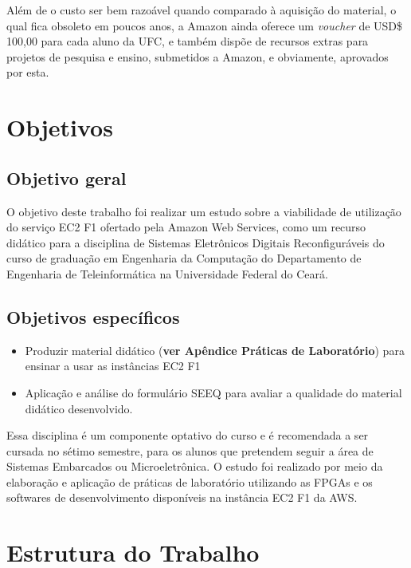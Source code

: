 Além de o custo ser bem razoável quando comparado à aquisição do material, o qual fica obsoleto em poucos anos, a Amazon ainda oferece um \textit{voucher} de USD\$ 100,00 para cada aluno da UFC, e também dispõe de recursos extras para projetos de pesquisa e ensino, submetidos a Amazon, e obviamente, aprovados por esta.
 
 
\section{Objetivos}\label{sec:objetivo}

\subsection{Objetivo geral}
O objetivo deste trabalho foi realizar um estudo sobre a viabilidade de utilização do serviço EC2 F1 ofertado pela Amazon Web Services, como um recurso didático para a disciplina de Sistemas Eletrônicos Digitais Reconfiguráveis do curso de graduação em Engenharia da Computação do Departamento de Engenharia de Teleinformática na Universidade Federal do Ceará.

\subsection{Objetivos específicos}
 \begin{itemize}
 \item Produzir material didático (\textbf{ver Apêndice Práticas de Laboratório}) para ensinar a usar as instâncias EC2 F1 
 
 \item Aplicação e análise do formulário SEEQ para avaliar a qualidade do material didático desenvolvido.
\end{itemize}


Essa disciplina é um componente optativo do curso e é recomendada a ser cursada no sétimo semestre, para os alunos que pretendem seguir a área de Sistemas Embarcados ou Microeletrônica. O estudo foi realizado por meio da elaboração e aplicação de práticas de laboratório utilizando as FPGAs e os softwares de desenvolvimento disponíveis na instância EC2 F1 da AWS.


\section{Estrutura do Trabalho}\label{sec:estrutura}
 
